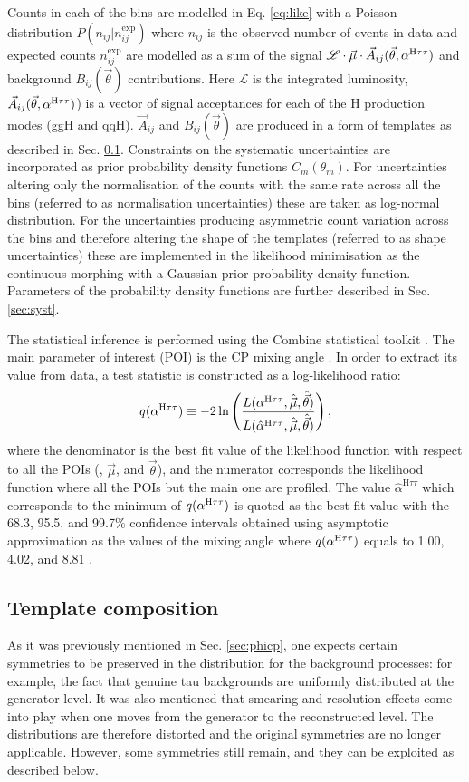 Counts in each of the bins are modelled in Eq. \ref{eq:like} with a Poisson distribution $P(n_{ij}|n_{ij}^\text{exp})$ where $n_{ij}$ is the observed number of events in data and expected counts $n_{ij}^\text{exp}$ are modelled as a sum of the signal $\mathcal{L} \cdot \vec{\mu} \cdot \vec{A}_{ij}(\vec{\theta}, \alpha^{\text{H}\tau\tau})$ and background $B_{ij}(\vec{\theta})$ contributions. Here $\mathcal{L}$ is the integrated luminosity, $\vec{A}_{ij}(\vec{\theta}, \alpha^{\text{H}\tau\tau})$) is a vector of signal acceptances for each of the H production modes (ggH and qqH). $\vec{A}_{ij}$ and $B_{ij}(\vec{\theta})$ are produced in a form of templates as described in Sec. \ref{sec:temp}. Constraints on the systematic uncertainties are incorporated as prior probability density functions $C_m(\theta_m)$. For uncertainties altering only the normalisation of the counts with the same rate across all the bins (referred to as normalisation uncertainties) these are taken as log-normal distribution. For the uncertainties producing asymmetric count variation across the bins and therefore altering the shape of the templates (referred to as shape uncertainties) these are implemented in the likelihood minimisation as the continuous morphing with a Gaussian prior probability density
function. Parameters of the probability density functions are further described in Sec. \ref{sec:syst}.

The statistical inference is performed using the Combine statistical toolkit \cite{combine}. The main parameter of interest (POI) is the CP mixing angle \mixa. In order to extract its value from data, a test statistic is constructed as a log-likelihood ratio:
\begin{equation}
    q(\alpha^{\text{H}\tau\tau}) \equiv -2\ln\left(\dfrac{L(\alpha^{\text{H}\tau\tau}, \hat{\vec{\mu}}, \hat{\vec{\theta}})}{L(\hat{\alpha}^{\text{H}\tau\tau}, \hat{\vec{\mu}}, \hat{\vec{\theta}})}\right),
\end{equation}
where the denominator is the best fit value of the likelihood function with respect to all the POIs (\mixa, $\vec{\mu}$, and $\vec{\theta}$), and the numerator corresponds the likelihood function where all the POIs but the main one are profiled. The value $\hat{\alpha}^{\text{H}\tau\tau}$ which corresponds to the minimum of $q(\alpha^{\text{H}\tau\tau})$ is quoted as the best-fit value with the 68.3, 95.5, and 99.7\% confidence intervals obtained using asymptotic approximation as the values of the mixing angle \mixa where $q(\alpha^{\text{H}\tau\tau})$ equals to 1.00, 4.02, and 8.81 \cite{Cowan:2010js}.

\subsection{Template composition}\label{sec:temp}
As it was previously mentioned in Sec. \ref{sec:phicp}, one expects certain symmetries to be preserved in the \phicp distribution for the background processes: for example, the fact that genuine tau backgrounds are uniformly distributed at the generator level. It was also mentioned that smearing and resolution effects come into play when one moves from the generator to the reconstructed level. The distributions are therefore distorted and the original symmetries are no longer applicable. However, some symmetries still remain, and they can be exploited as described below.

